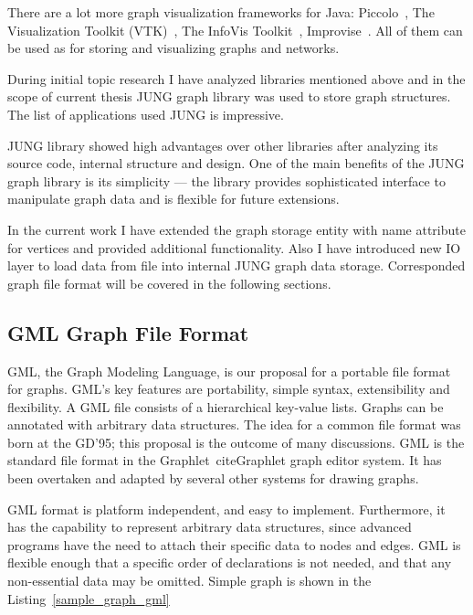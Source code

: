 There are a lot more graph visualization frameworks for Java: Piccolo~\cite{Piccolo}, The Visualization Toolkit (VTK)~\cite{VTK}, The InfoVis Toolkit~\cite{InfoVis_Toolkit},
Improvise~\cite{Improvise}. All of them can be used as for storing and visualizing graphs and networks.


During initial topic research I have analyzed libraries mentioned above and in the scope of current thesis JUNG graph library was used to store graph structures.
The list of applications used JUNG is impressive.

JUNG library showed high advantages over other libraries after analyzing its source code, internal structure and design.
One of the main benefits of the JUNG graph library is its simplicity --- the library provides sophisticated interface to manipulate graph data and is flexible for future extensions.

In the current work I have extended the graph storage entity with name attribute for vertices and provided additional functionality. Also I have introduced new IO layer
to load data from file into internal JUNG graph data storage. Corresponded graph file format will be covered in the following sections.

\subsection{GML Graph File Format}
 GML, the Graph Modeling Language, is our proposal for a portable file format for graphs. GML's key features are portability, simple syntax, extensibility and flexibility.
 A GML file consists of a hierarchical key-value lists. Graphs can be annotated with arbitrary data structures.
 The idea for a common file format was born at the GD'95; this proposal is the outcome of many discussions.
 GML is the standard file format in the Graphlet~cite{Graphlet} graph editor system.
 It has been overtaken and adapted by several other systems for drawing graphs.~\cite{GML}


GML format is platform independent, and easy to implement.
Furthermore, it has the capability to represent arbitrary data structures, since advanced programs have the need to attach their specific data to nodes and edges.
GML is flexible enough that a specific order of declarations is not needed, and that any non-essential data may be omitted. Simple graph is shown in the Listing~\ref{sample_graph_gml}

\begin{center}
    \renewcommand{\thelstlisting}{\thesection.\arabic{lstlisting}}
	
\end{center}

